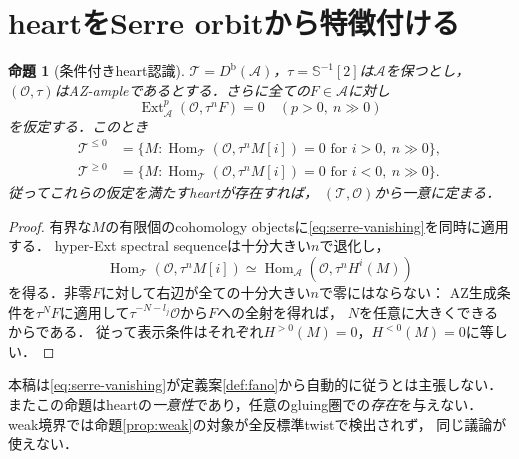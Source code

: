 \documentclass[11pt,a4paper]{ltjsarticle}
\newtheorem{proposition}[theorem]{命題}
\theoremstyle{definition}
\newcommand{\OO}{\mathcal O}
\renewcommand{\AA}{\mathcal A}
\newcommand{\TT}{\mathcal T}
\newcommand{\SSer}{\mathbb S}
\newcommand{\Db}{D^{\mathrm b}}
\newcommand{\Hom}{\operatorname{Hom}}
\newcommand{\Ext}{\operatorname{Ext}}
\begin{document}
\section{heartをSerre orbitから特徴付ける}
\begin{proposition}[条件付きheart認識]\label{prop:heart}
$\TT=\Db(\AA)$，$\tau=\SSer^{-1}[2]$は$\AA$を保つとし，
$(\OO,\tau)$はAZ-ampleであるとする．さらに全ての$F\in\AA$に対し
\begin{equation}\label{eq:serre-vanishing}
 \Ext_{\AA}^p(\OO,\tau^nF)=0
 \quad(p>0,\ n\gg0)
\end{equation}
を仮定する．このとき
\begin{align}
 \TT^{\leq0}
 &=\{M:\Hom_{\TT}(\OO,\tau^nM[i])=0
       \text{ for }i>0,\ n\gg0\},\label{eq:heart-upper}\\
 \TT^{\geq0}
 &=\{M:\Hom_{\TT}(\OO,\tau^nM[i])=0
       \text{ for }i<0,\ n\gg0\}.\label{eq:heart-lower}
\end{align}
従ってこれらの仮定を満たすheartが存在すれば，
$(\TT,\OO)$から一意に定まる．
\end{proposition}
\begin{proof}
有界な$M$の有限個のcohomology objectsに\eqref{eq:serre-vanishing}を同時に適用する．
hyper-Ext spectral sequenceは十分大きい$n$で退化し，
\[
 \Hom_{\TT}(\OO,\tau^nM[i])
 \simeq\Hom_{\AA}(\OO,\tau^nH^i(M))
\]
を得る．非零$F$に対して右辺が全ての十分大きい$n$で零にはならない：
AZ生成条件を$\tau^NF$に適用して$\tau^{-N-l_j}\OO$から$F$への全射を得れば，
$N$を任意に大きくできるからである．
従って表示条件はそれぞれ$H^{>0}(M)=0$，$H^{<0}(M)=0$に等しい．
\end{proof}

本稿は\eqref{eq:serre-vanishing}が定義案\ref{def:fano}から自動的に従うとは主張しない．
またこの命題はheartの\emph{一意性}であり，任意のgluing圏での\emph{存在}を与えない．
weak境界では命題\ref{prop:weak}の対象が全反標準twistで検出されず，
同じ議論が使えない．
\end{document}
